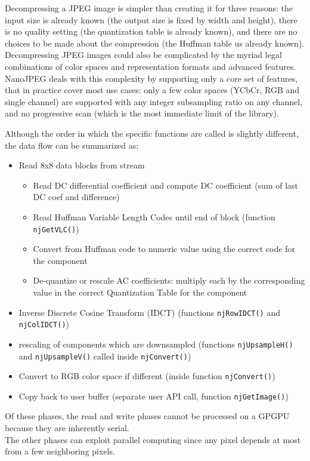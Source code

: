 Decompressing a JPEG image is simpler than creating it for three reasons: the input size is already known (the output size is fixed by width and height), there is no quality setting (the quantization table is already known), and there are no choices to be made about the compression (the Huffman table us already known).\\
Decompressing JPEG images could also be complicated by the myriad legal combinations of color spaces and representation formats and advanced features. NanoJPEG deals with this complexity by supporting only a core set of features, that in practice cover most use cases: only a few color spaces (YCbCr, RGB and single channel) are supported with any integer subsampling ratio on any channel, and no progressive scan (which is the most immediate limit of the library).

Although the order in which the specific functions are called is slightly different, the data flow can be summarized as:
\begin{itemize}
    \item Read 8x8 data blocks from stream
    \begin{itemize}
        \item Read DC differential coefficient and compute DC coefficient (sum of last DC coef and difference)
        \item Read Huffman Variable Length Codes until end of block (function \texttt{njGetVLC()})
        \item Convert from Huffman code to numeric value using the correct code for the component
        \item De-quantize or rescale AC coefficients: multiply each by the corresponding value in the correct Quantization Table for the component
    \end{itemize}
    \item Inverse Discrete Cosine Transform (IDCT) (functions \texttt{njRowIDCT()} and \texttt{njColIDCT()})
    \item rescaling of components which are downsampled (functions \texttt{njUpsampleH()} and \texttt{njUpsampleV()} called inside \texttt{njConvert()})
    \item Convert to RGB color space if different (inside function \texttt{njConvert()})
    \item Copy back to user buffer (separate user API call, function \texttt{njGetImage()})
\end{itemize}
Of these phases, the read and write phases cannot be processed on a GPGPU because they are inherently serial.\\
The other phases can exploit parallel computing since any pixel depends at most from a few neighboring pixels.

